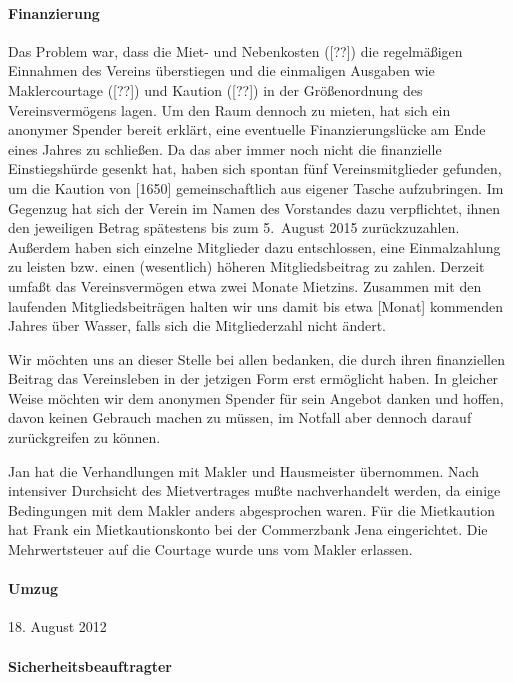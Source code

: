 \documentclass[10pt,DIV16]{scrartcl}
\begin{document}
\paragraph{Finanzierung}
\label{sec:krautspace_kaution}
Das Problem war, dass die Miet- und Nebenkosten ([??\EUR]) die regelmäßigen
Einnahmen des Vereins überstiegen und die einmaligen Ausgaben wie
Maklercourtage ([??\EUR]) und Kaution ([??\EUR]) in der Größenordnung des
Vereinsvermögens lagen.  Um den Raum dennoch zu mieten, hat sich ein anonymer
Spender bereit erklärt, eine eventuelle Finanzierungslücke am Ende eines
Jahres zu schließen.  Da das aber immer noch nicht die finanzielle
Einstiegshürde gesenkt hat, haben sich spontan fünf Vereinsmitglieder
gefunden, um die Kaution von [1650\EUR] gemeinschaftlich aus eigener Tasche
aufzubringen.  Im Gegenzug hat sich der Verein im Namen des Vorstandes dazu
verpflichtet, ihnen den jeweiligen Betrag spätestens bis zum 5.\ August 2015
zurückzuzahlen.  Außerdem haben sich einzelne Mitglieder dazu entschlossen,
eine Einmalzahlung zu leisten bzw. einen (wesentlich) höheren Mitgliedsbeitrag
zu zahlen.  Derzeit umfaßt das Vereinsvermögen etwa zwei Monate Mietzins.
Zusammen mit den laufenden Mitgliedsbeiträgen halten wir uns damit bis etwa
[Monat] kommenden Jahres über Wasser, falls sich die Mitgliederzahl nicht
ändert.

Wir möchten uns an dieser Stelle bei allen bedanken, die durch ihren
finanziellen Beitrag das Vereinsleben in der jetzigen Form erst ermöglicht
haben.  In gleicher Weise möchten wir dem anonymen Spender für sein Angebot
danken und hoffen, davon keinen Gebrauch machen zu müssen, im Notfall aber
dennoch darauf zurückgreifen zu können.

Jan hat die Verhandlungen mit Makler und Hausmeister übernommen.  Nach
intensiver Durchsicht des Mietvertrages mußte nachverhandelt werden, da einige
Bedingungen mit dem Makler anders abgesprochen waren.  Für die Mietkaution hat
Frank ein Mietkautionskonto bei der Commerzbank Jena eingerichtet.  Die
Mehrwertsteuer auf die Courtage wurde uns vom Makler erlassen.

\paragraph{Umzug}

18. August 2012

\paragraph{Sicherheitsbeauftragter}
\end{document}
